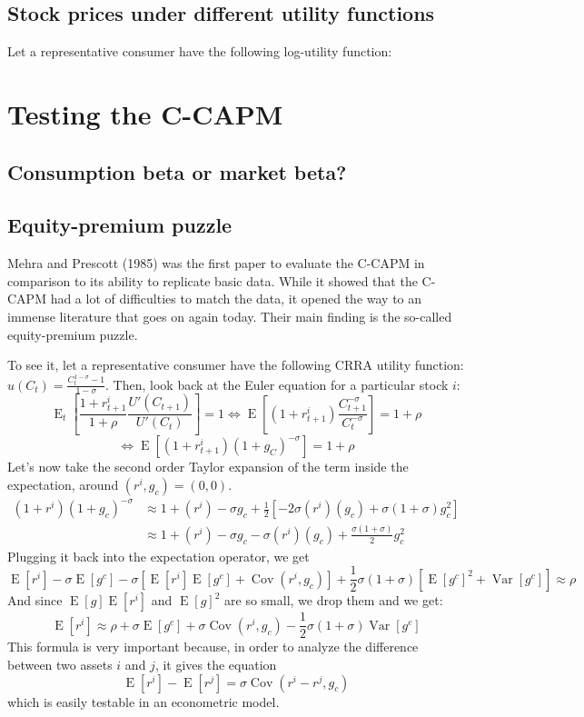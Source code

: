 \documentclass[12pt]{report}
\newcommand{\E}[1]{\operatorname{E}\left[#1\right]}
\newcommand{\Et}[1]{\operatorname{E}_t\left[#1\right]}
\newcommand{\V}[1]{\operatorname{Var}\left[#1\right]}
\newcommand{\cov}[1]{\operatorname{Cov}\left(#1\right)}
\begin{document}
\subsection{Stock prices under different utility functions}

Let a representative consumer have the following log-utility function:

\section{Testing the C-CAPM}

\subsection{Consumption beta or market beta?}



\subsection{Equity-premium puzzle}

Mehra and Prescott (1985) was the first paper to evaluate the C-CAPM in comparison to its ability to replicate basic data. While it showed that the C-CAPM had a lot of difficulties to match the data, it opened the way to an immense literature that goes on again today. Their main finding is the so-called equity-premium puzzle.

To see it, let a representative consumer have the following CRRA utility function: $u(C_t) = \frac{C_t^{1-\sigma} - 1}{1 - \sigma}$. Then, look back at the Euler equation for a particular stock $i$:$$ \Et{\frac{1+r_{t+1}^i}{1+\rho} \frac{U'(C_{t+1})}{U'(C_t)}} = 1 \Leftrightarrow \E{(1+r_{t+1}^i)\frac{C_{t+1}^{-\sigma}}{C_t^{-\sigma}}} = 1 + \rho $$ $$\Leftrightarrow \E{(1+r_{t+1}^i)(1+g_C)^{-\sigma}} = 1 + \rho $$
Let's now take the second order Taylor expansion of the term inside the expectation, around $(r^i,g_c) = (0,0)$.
\begin{align*}
(1+r^i)(1+g_c)^{-\sigma} & \approx 1 + (r^i) -\sigma g_c + \frac{1}{2}\left[-2\sigma(r^i)(g_c) + \sigma(1+\sigma)g_c^2\right] \\ & \approx 1 + (r^i) -\sigma g_c -\sigma(r^i)(g_c) + \frac{\sigma(1+\sigma)}{2} g_c^2
\end{align*}
Plugging it back into the expectation operator, we get $$\E{r^i} -\sigma\E{g^c} - \sigma[\E{r^i}\E{g^c} + \cov{r^i, g_c}] + \frac{1}{2}\sigma(1+\sigma)[\E{g^c}^2 + \V{g^c}] \approx \rho $$
And since $\E{g}\E{r^i}$ and $\E{g}^2$ are so small, we drop them and we get: $$\E{r^i} \approx \rho +\sigma\E{g^c} + \sigma\cov{r^i, g_c} - \frac{1}{2}\sigma(1+\sigma)\V{g^c}$$
This formula is very important because, in order to analyze the difference between two assets $i$ and $j$, it gives the equation $$\E{r^i} - \E{r^j} = \sigma\cov{r^i - r^j, g_c}$$which is easily testable in an econometric model.
\end{document}
